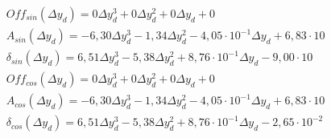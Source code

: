 \begin{eqnarray}
&Off_{sin}(\Delta y_d) =0\Delta y_d^{3}+0\Delta y_d^{2}+0\Delta y_d+0 \\
&A_{sin}(\Delta y_d) =-6,30\Delta y_d^{3}-1,34\Delta y_d^{2}-4,05\cdot 10^{-1}\Delta y_d+6,83\cdot 10 \\                                 
&\delta_{sin}(\Delta y_d) =6,51\Delta y_d^{3}-5,38\Delta y_d^{2}+8,76\cdot 10^{-1}\Delta y_d-9,00\cdot 10 \\                             
&Off_{cos}(\Delta y_d) =0\Delta y_d^{3}+0\Delta y_d^{2}+0\Delta y_d+0 \\
&A_{cos}(\Delta y_d) =-6,30\Delta y_d^{3}-1,34\Delta y_d^{2}-4,05\cdot 10^{-1}\Delta y_d+6,83\cdot 10 \\                                 
&\delta_{cos}(\Delta y_d) =6,51\Delta y_d^{3}-5,38\Delta y_d^{2}+8,76\cdot 10^{-1}\Delta y_d-2,65\cdot 10^{-2} 
\end{eqnarray}

